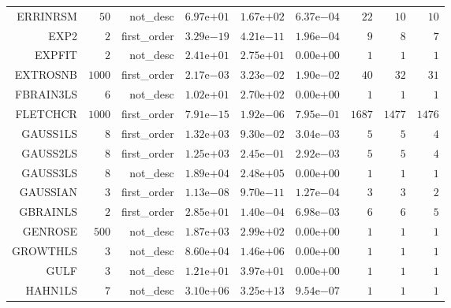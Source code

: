 \begin{longtable}{rrrrrrrrr}
ERRINRSM & \(    50\) & not\_desc & \( 6.97\)e\(+01\) & \( 1.67\)e\(+02\) & \( 6.37\)e\(-04\) & \(    22\) & \(    10\) & \(    10\) \\
EXP2 & \(     2\) & first\_order & \( 3.29\)e\(-19\) & \( 4.21\)e\(-11\) & \( 1.96\)e\(-04\) & \(     9\) & \(     8\) & \(     7\) \\
EXPFIT & \(     2\) & not\_desc & \( 2.41\)e\(+01\) & \( 2.75\)e\(+01\) & \( 0.00\)e\(+00\) & \(     1\) & \(     1\) & \(     1\) \\
EXTROSNB & \(  1000\) & first\_order & \( 2.17\)e\(-03\) & \( 3.23\)e\(-02\) & \( 1.90\)e\(-02\) & \(    40\) & \(    32\) & \(    31\) \\
FBRAIN3LS & \(     6\) & not\_desc & \( 1.02\)e\(+01\) & \( 2.70\)e\(+02\) & \( 0.00\)e\(+00\) & \(     1\) & \(     1\) & \(     1\) \\
FLETCHCR & \(  1000\) & first\_order & \( 7.91\)e\(-15\) & \( 1.92\)e\(-06\) & \( 7.95\)e\(-01\) & \(  1687\) & \(  1477\) & \(  1476\) \\
GAUSS1LS & \(     8\) & first\_order & \( 1.32\)e\(+03\) & \( 9.30\)e\(-02\) & \( 3.04\)e\(-03\) & \(     5\) & \(     5\) & \(     4\) \\
GAUSS2LS & \(     8\) & first\_order & \( 1.25\)e\(+03\) & \( 2.45\)e\(-01\) & \( 2.92\)e\(-03\) & \(     5\) & \(     5\) & \(     4\) \\
GAUSS3LS & \(     8\) & not\_desc & \( 1.89\)e\(+04\) & \( 2.48\)e\(+05\) & \( 0.00\)e\(+00\) & \(     1\) & \(     1\) & \(     1\) \\
GAUSSIAN & \(     3\) & first\_order & \( 1.13\)e\(-08\) & \( 9.70\)e\(-11\) & \( 1.27\)e\(-04\) & \(     3\) & \(     3\) & \(     2\) \\
GBRAINLS & \(     2\) & first\_order & \( 2.85\)e\(+01\) & \( 1.40\)e\(-04\) & \( 6.98\)e\(-03\) & \(     6\) & \(     6\) & \(     5\) \\
GENROSE & \(   500\) & not\_desc & \( 1.87\)e\(+03\) & \( 2.99\)e\(+02\) & \( 0.00\)e\(+00\) & \(     1\) & \(     1\) & \(     1\) \\
GROWTHLS & \(     3\) & not\_desc & \( 8.60\)e\(+04\) & \( 1.46\)e\(+06\) & \( 0.00\)e\(+00\) & \(     1\) & \(     1\) & \(     1\) \\
GULF & \(     3\) & not\_desc & \( 1.21\)e\(+01\) & \( 3.97\)e\(+01\) & \( 0.00\)e\(+00\) & \(     1\) & \(     1\) & \(     1\) \\
HAHN1LS & \(     7\) & not\_desc & \( 3.10\)e\(+06\) & \( 3.25\)e\(+13\) & \( 9.54\)e\(-07\) & \(     1\) & \(     1\) & \(     1\) \\

\end{longtable}
